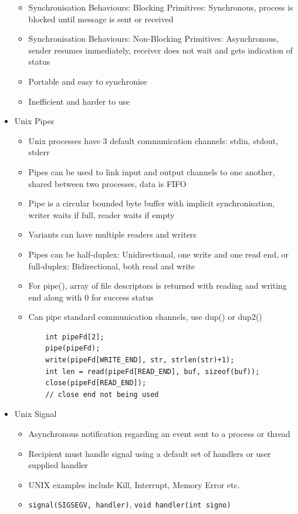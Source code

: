 \documentclass[10pt, landscape]{article}
\begin{document}
\begin{multicols*}{3}
\begin{itemize}
\begin{itemize}
        \item Synchronisation Behaviours: Blocking Primitives: Synchronous, process is blocked until message is sent or received
        \item Synchronisation Behaviours: Non-Blocking Primitives: Asynchronous, sender resumes immediately, receiver does not wait and gets indication of status
        \item Portable and easy to synchronise
        \item Inefficient and harder to use
    \end{itemize}
    \item Unix Pipes
    \begin{itemize}
        \item Unix processes have 3 default communication channels: stdin, stdout, stderr
        \item Pipes can be used to link input and output channels to one another, shared between two processes, data is FIFO
        \item Pipe is a circular bounded byte buffer with implicit synchronisation, writer waits if full, reader waits if empty
        \item Variants can have multiple readers and writers
        \item Pipes can be half-duplex: Unidirectional, one write and one read end, or full-duplex: Bidirectional, both read and write
        \item For pipe(), array of file descriptors is returned with reading and writing end along with 0 for success status
        \item Can pipe standard communication channels, use dup() or dup2()
        \begin{verbatim}
    int pipeFd[2];
    pipe(pipeFd);
    write(pipeFd[WRITE_END], str, strlen(str)+1);
    int len = read(pipeFd[READ_END], buf, sizeof(buf));
    close(pipeFd[READ_END]);
    // close end not being used
        \end{verbatim}
    \end{itemize}
    \item Unix Signal
    \begin{itemize}
        \item Asynchronous notification regarding an event sent to a process or thread
        \item Recipient must handle signal using a default set of handlers or user supplied handler
        \item UNIX examples include Kill, Interrupt, Memory Error etc.
        \item \verb|signal(SIGSEGV, handler)|, \verb|void handler(int signo)|
    \end{itemize}
\end{itemize}


\end{multicols*}
\end{document}
